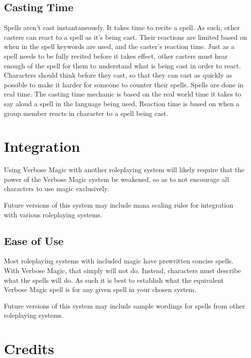 \section{Casting Time}
Spells aren't cast instantaneously.
It takes time to recite a spell.
As such, other casters can react to a spell as it's being cast.
Their reactions are limited based on when in the spell keywords are used, and the caster's reaction time.
Just as a spell needs to be fully recited before it takes effect, other casters must hear enough of the spell for them to understand what is being cast in order to react.
Characters should think before they cast, so that they can cast as quickly as possible to make it harder for someone to counter their spells.
Spells are done in real time.
The casting time mechanic is based on the real world time it takes to say aloud a spell in the language being used.
Reaction time is based on when a group member reacts in character to a spell being cast.

\chapter{Integration}
Using Verbose Magic with another roleplaying system will likely require that the power of the Verbose Magic system be weakened, so as to not encourage all characters to use magic exclusively.

\begin{rpg-commentbox}
	Future versions of this system may include mana scaling rules for integration with various roleplaying systems.
\end{rpg-commentbox}

\section{Ease of Use}
Most roleplaying systems with included magic have prewritten concise spells.
With Verbose Magic, that simply will not do.
Instead, characters must describe what the spells will do.
As such it is best to establish what the equivalent Verbose Magic spell is for any given spell in your chosen system.

\begin{rpg-commentbox}
	Future versions of this system may include sample wordings for spells from other roleplaying systems.
\end{rpg-commentbox}

\appendix
\chapter{Credits}

